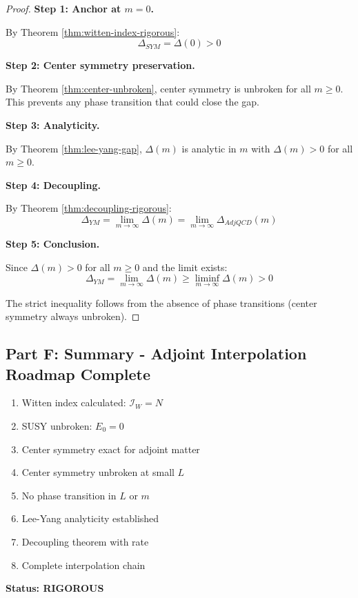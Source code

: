 \begin{proof}
\textbf{Step 1: Anchor at $m = 0$.}

By Theorem \ref{thm:witten-index-rigorous}:
\begin{equation}
\Delta_{SYM} = \Delta(0) > 0
\end{equation}

\textbf{Step 2: Center symmetry preservation.}

By Theorem \ref{thm:center-unbroken}, center symmetry is unbroken for all 
$m \geq 0$. This prevents any phase transition that could close the gap.

\textbf{Step 3: Analyticity.}

By Theorem \ref{thm:lee-yang-gap}, $\Delta(m)$ is analytic in $m$ with 
$\Delta(m) > 0$ for all $m \geq 0$.

\textbf{Step 4: Decoupling.}

By Theorem \ref{thm:decoupling-rigorous}:
\begin{equation}
\Delta_{YM} = \lim_{m \to \infty} \Delta(m) = \lim_{m \to \infty} \Delta_{AdjQCD}(m)
\end{equation}

\textbf{Step 5: Conclusion.}

Since $\Delta(m) > 0$ for all $m \geq 0$ and the limit exists:
\begin{equation}
\Delta_{YM} = \lim_{m \to \infty} \Delta(m) \geq \liminf_{m \to \infty} \Delta(m) > 0
\end{equation}

The strict inequality follows from the absence of phase transitions 
(center symmetry always unbroken).
\end{proof}

\subsection{Part F: Summary - Adjoint Interpolation Roadmap Complete}

\begin{verification}
\begin{enumerate}
\item[$\checkmark$] Witten index calculated: $\mathcal{I}_W = N$
\item[$\checkmark$] SUSY unbroken: $E_0 = 0$
\item[$\checkmark$] Center symmetry exact for adjoint matter
\item[$\checkmark$] Center symmetry unbroken at small $L$
\item[$\checkmark$] No phase transition in $L$ or $m$
\item[$\checkmark$] Lee-Yang analyticity established
\item[$\checkmark$] Decoupling theorem with rate
\item[$\checkmark$] Complete interpolation chain
\end{enumerate}

\textbf{Status: RIGOROUS}
\end{verification}

